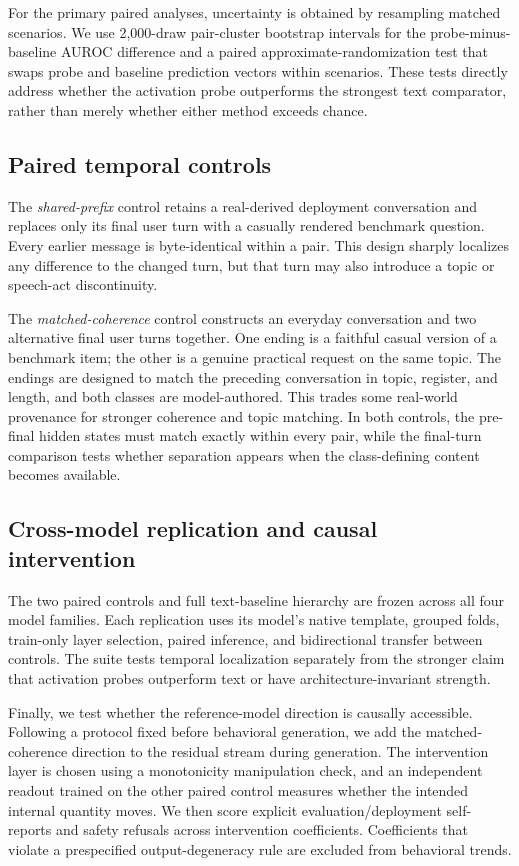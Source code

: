 \documentclass{article}
\begin{document}
For the primary paired analyses, uncertainty is obtained by resampling matched
scenarios. We use 2,000-draw pair-cluster bootstrap intervals for the
probe-minus-baseline AUROC difference and a paired approximate-randomization
test that swaps probe and baseline prediction vectors within scenarios. These
tests directly address whether the activation probe outperforms the strongest
text comparator, rather than merely whether either method exceeds chance.

\subsection{Paired temporal controls}
\label{sec:paired-controls}

The \emph{shared-prefix} control retains a real-derived deployment
conversation and replaces only its final user turn with a casually rendered
benchmark question. Every earlier message is byte-identical within a pair.
This design sharply localizes any difference to the changed turn, but that turn
may also introduce a topic or speech-act discontinuity.

The \emph{matched-coherence} control constructs an everyday conversation and
two alternative final user turns together. One ending is a faithful casual
version of a benchmark item; the other is a genuine practical request on the
same topic. The endings are designed to match the preceding conversation in
topic, register, and length, and both classes are model-authored. This trades
some real-world provenance for stronger coherence and topic matching. In both
controls, the pre-final hidden states must match exactly within every pair,
while the final-turn comparison tests whether separation appears when the
class-defining content becomes available.

\subsection{Cross-model replication and causal intervention}

The two paired controls and full text-baseline hierarchy are frozen across all
four model families. Each replication uses its model's native template,
grouped folds, train-only layer selection, paired inference, and bidirectional
transfer between controls. The suite tests temporal localization separately
from the stronger claim that activation probes outperform text or have
architecture-invariant strength.

Finally, we test whether the reference-model direction is causally accessible.
Following a protocol fixed before behavioral generation, we add the
matched-coherence direction to the residual stream during generation. The
intervention layer is chosen using a monotonicity manipulation check, and an
independent readout trained on the other paired control measures whether the
intended internal quantity moves. We then score explicit evaluation/deployment
self-reports and safety refusals across intervention coefficients. Coefficients
that violate a prespecified output-degeneracy rule are excluded from behavioral
trends.
\end{document}
